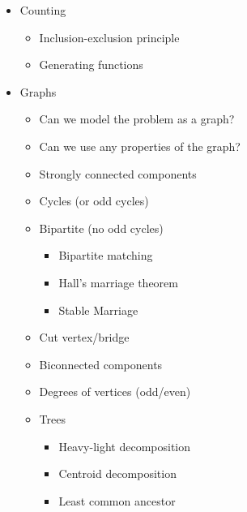 \documentclass[11.5pt,a4paper,landscape,oneside]{amsart}
\newenvironment{myitemize}
{ \begin{itemize}[leftmargin=.5cm]
    \setlength{\itemsep}{0pt}
    \setlength{\parskip}{0pt}
    \setlength{\parsep}{0pt}     }
{ \end{itemize}                  }
\begin{document}
\begin{multicols*}{2}
\begin{myitemize}
                    \begin{itemize}
                        \item Sqrt buckets
                        \item Store $2^k$ jump pointers
                        \item $2^k$ merging trick
                    \end{itemize}
                \item Counting
                    \begin{itemize}
                        \item Inclusion-exclusion principle
                        \item Generating functions
                    \end{itemize}
                \item Graphs
                    \begin{itemize}
                        \item Can we model the problem as a graph?
                        \item Can we use any properties of the graph?
                        \item Strongly connected components
                        \item Cycles (or odd cycles)
                        \item Bipartite (no odd cycles)
                            \begin{itemize}
                                \item Bipartite matching
                                \item Hall's marriage theorem
                                \item Stable Marriage
                            \end{itemize}
                        \item Cut vertex/bridge
                        \item Biconnected components
                        \item Degrees of vertices (odd/even)
                        \item Trees
                            \begin{itemize}
                                \item Heavy-light decomposition
                                \item Centroid decomposition
                                \item Least common ancestor

\end{itemize}
\end{itemize}
\end{myitemize}
\end{multicols*}
\end{document}
